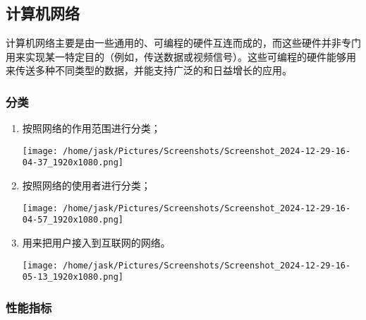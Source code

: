 \documentclass[11pt]{article}
\begin{document}
\subsection{计算机网络}
\label{sec:orgc52764e}

计算机网络主要是由一些通用的、可编程的硬件互连而成的，而这些硬件并非专门用来实现某一特定目的（例如，传送数据或视频信号）。这些可编程的硬件能够用来传送多种不同类型的数据，并能支持广泛的和日益增长的应用。
\subsubsection{分类}
\label{sec:org3b69cff}

\begin{enumerate}
\item 按照网络的作用范围进行分类；
\label{sec:org87957ae}
\begin{center}
\texttt{[image: /home/jask/Pictures/Screenshots/Screenshot\_2024-12-29-16-04-37\_1920x1080.png]}
\end{center}
\item 按照网络的使用者进行分类；
\label{sec:orgc32ea21}
\begin{center}
\texttt{[image: /home/jask/Pictures/Screenshots/Screenshot\_2024-12-29-16-04-57\_1920x1080.png]}
\end{center}
\item 用来把用户接入到互联网的网络。
\label{sec:org834eda9}
\begin{center}
\texttt{[image: /home/jask/Pictures/Screenshots/Screenshot\_2024-12-29-16-05-13\_1920x1080.png]}
\end{center}
\end{enumerate}
\subsubsection{性能指标}
\label{sec:org41c490d}
\end{document}
